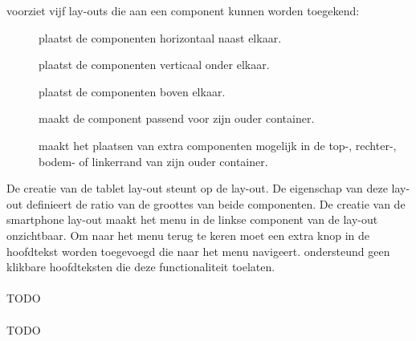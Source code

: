 \st{} voorziet vijf lay-outs die aan een component kunnen worden toegekend:
\begin{description}
 \item [] plaatst de componenten horizontaal naast elkaar.
 \item [] plaatst de componenten verticaal onder elkaar.
 \item [] plaatst de componenten boven elkaar.
 \item [] maakt de component passend voor zijn ouder container.
 \item [] maakt het plaatsen van extra componenten mogelijk in de top-, rechter-, bodem- of linkerrand van zijn ouder container.
\end{description}
De creatie van de tablet lay-out steunt op de  lay-out.
De  eigenschap van deze lay-out definieert de ratio van de groottes van beide componenten.
De creatie van de smartphone lay-out maakt het menu in de linkse component van de lay-out onzichtbaar.
Om naar het menu terug te keren moet een extra knop in de hoofdtekst worden toegevoegd die naar het menu navigeert.
\st{} ondersteund geen klikbare hoofdteksten die deze functionaliteit toelaten.

\paragraph{\kendo}
TODO

\paragraph{\lungo}
TODO

\begin{table}[H]
\centering
{}
\caption{Scores voor U9: Toestelspecifieke lay-out}
\label{tabel:evaluatie-gebruik-u9}
\end{table}

